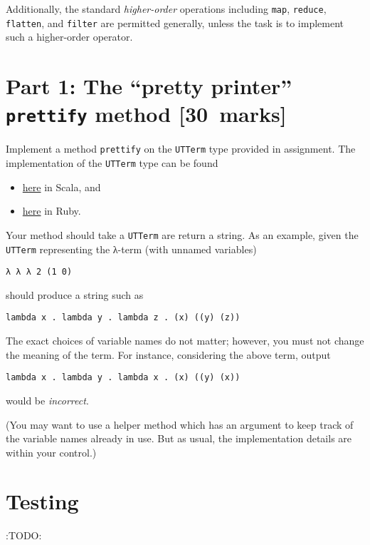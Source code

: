 \documentclass[11pt]{article}
\begin{document}
Additionally, the standard \emph{higher-order} operations
including \texttt{map}, \texttt{reduce}, \texttt{flatten}, and \texttt{filter} are permitted generally,
unless the task is to implement such a higher-order operator.

\section*{Part 1: The “pretty printer” \texttt{prettify} method  [30 marks]}
\label{sec:org9231a69}
Implement a method \texttt{prettify} on the \texttt{UTTerm} type
provided in assignment.
The implementation of the \texttt{UTTerm} type can be found
\begin{itemize}
\item \href{./../assignments/src/a2\_ulterm.sc}{here} in Scala, and
\item \href{./../assignments/src/a2\_ulterm.rb}{here} in Ruby.
\end{itemize}

Your method should take a \texttt{UTTerm} are return a string.
As an example, given the \texttt{UTTerm} representing the
λ-term (with unnamed variables)
\begin{verbatim}
λ λ λ 2 (1 0)
\end{verbatim}
should produce a string such as
\begin{verbatim}
lambda x . lambda y . lambda z . (x) ((y) (z))
\end{verbatim}

The exact choices of variable names do not matter;
however, you must not change the meaning of the term.
For instance, considering the above term, output
\begin{verbatim}
lambda x . lambda y . lambda x . (x) ((y) (x))
\end{verbatim}
would be \emph{incorrect}.

(You may want to use a helper method which has an argument to
keep track of the variable names already in use.
But as usual, the implementation details are within your control.)

\section*{Testing}
\label{sec:org842979b}
:TODO:
\end{document}
